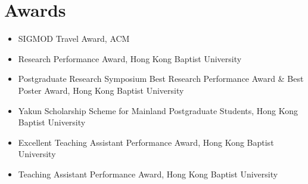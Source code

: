 \documentclass{mycv}
\begin{document}
\section{Awards}
\begin{itemize}
  \item SIGMOD Travel Award, ACM 
  \item Research Performance Award, Hong Kong Baptist University 
  \item Postgraduate Research Symposium Best Research Performance Award \& Best Poster Award, Hong Kong Baptist University 
  \item Yakun Scholarship Scheme for Mainland Postgraduate Students, Hong Kong Baptist University 
  \item Excellent Teaching Assistant Performance Award, Hong Kong Baptist University 
  \item Teaching Assistant Performance Award, Hong Kong Baptist University 
\end{itemize}
\end{document}
